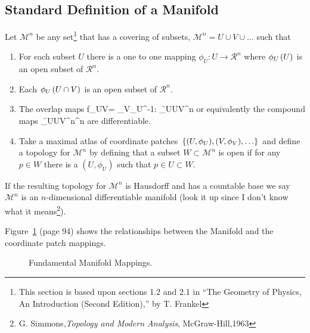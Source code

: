 \subsection{Standard Definition of a Manifold}
Let $\mathcal{M}^{n}$ be any set\footnote{This section is based upon sections 1.2 and 2.1 in 
``The Geometry of Physics, An Introduction (Second Edition),'' by T. Frankel} that has 
a covering of subsets, $\mathcal{M}^{n} = U\cup V\cup\dots$ such that
\begin{enumerate}
	\item For each subset $U$ there is a one to one mapping $\phi_{U}:U\rightarrow\mathcal{R}^{n}$ where ${\phi_{U}}\left ( {U} \right )$ is an 
	open subset of $\mathcal{R}^{n}$.
	\item Each ${\phi_{U}}\left ( {U\cap V} \right )$ is an open subset of $\mathcal{R}^{n}$.
	\item The overlap maps
		\be
			f_{UV}= \phi_{V}\circ\phi_{U}^{-1}: \f{\phi_{U}}{U\cap V}\rightarrow{}^{n}
		\ee
	or equivalently the compound maps
		\be
			\f{\phi_{U}}{U\cap V}^{n}^{n}
		\ee
	are differentiable.
	\item Take a maximal atlas of coordinate patches $\left \{ {(U,\phi_{U}),(V,\phi_{V}),\dots} \right \}$ and define a topology for $\mathcal{M}^{n}$ by defining
	that a subset $W\subset \mathcal{M}^{n}$ is open if for any $p \in W$ there is a $(U,\phi_{U})$ such that $p\in U\subset W$.
\end{enumerate}
If the resulting topology for $\mathcal{M}^{n}$ is Hausdorff and has a countable base we say $\mathcal{M}^{n}$ is an $n$-dimensional differentiable manifold 
(look it up since I don't know what it means\footnote{G. Simmons,{\em Topology and Modern Analysis}, McGraw-Hill,1963}).

Figure~\ref{fig5_3} (page 94) shows the relationships between the Manifold and the coordinate patch mappings.

\begin{figure}[htbp]
\begin{center}
\caption{Fundamental Manifold Mappings.}\label{fig5_3}
\end{center}
\end{figure}

